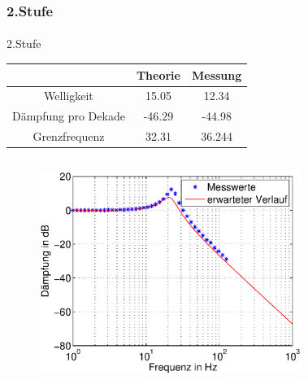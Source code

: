 \begin{frame}
\begin{columns}[c]
\begin{figure}[H]
\begin{center}
    \end{center}
    \end{figure}
\end{columns}
\end{frame}

\begin{frame}
\frametitle{2.Stufe}
\framesubtitle{}
    \begin{block}{2.Stufe}
        \begin{tabular}{c|c|c}
        & Theorie & Messung \\ 
        \hline
        Welligkeit & 15.05&12.34 \\
        Dämpfung pro Dekade & -46.29& -44.98\\
        Grenzfrequenz & 32.31& 36.244
        \end{tabular}
    \end{block}
\begin{columns}[c]
    \begin{figure}[H]
    \begin{center}
            \includegraphics[scale=0.3]{./img/plots/Auf_4_bode_rechts_db.eps}
    \end{center}
    \end{figure}
    \begin{figure}[H]
    \begin{center}

\end{center}
\end{figure}
\end{columns}
\end{frame}
